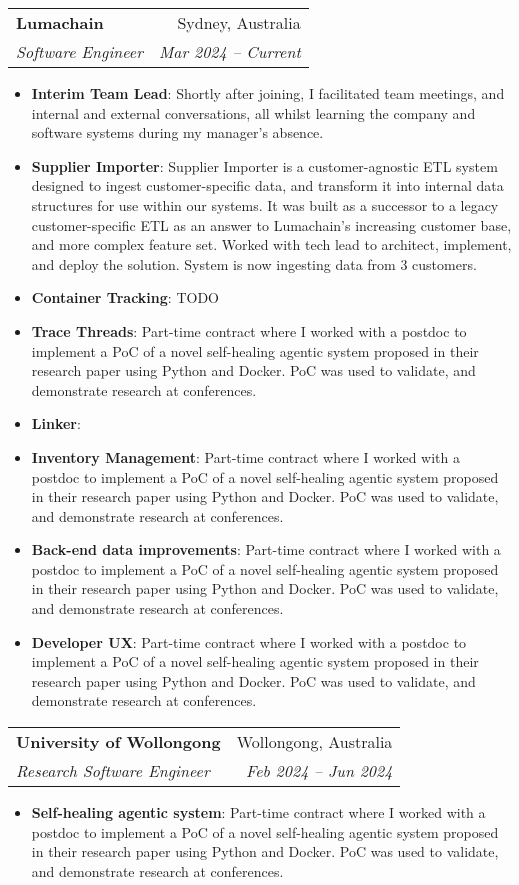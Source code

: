\documentclass[letterpaper,11pt]{article}
\makeatletter
\newcommand{\resumeItem}[2]{
  \item\small{
    \textbf{#1}{: #2 \vspace{-2pt}}
  }
}
\newcommand{\resumeSubheading}[4]{
  \vspace{-1pt}\item
    \begin{tabular*}{0.97\textwidth}[t]{l@{\extracolsep{\fill}}r}
      \textbf{#1} & #2 \\
      \textit{\small#3} & \textit{\small #4} \\
    \end{tabular*}\vspace{-5pt}
}
\newcommand{\resumeItemListStart}{\begin{itemize}}
\newcommand{\resumeItemListEnd}{\end{itemize}\vspace{-5pt}}
\makeatother
\begin{document}
    \resumeSubheading
      {Lumachain}{Sydney, Australia}
      {Software Engineer}{Mar 2024 -- Current}
      \resumeItemListStart
        \resumeItem{Interim Team Lead}
          {Shortly after joining, I facilitated team meetings, and internal and external conversations, all whilst learning the company and software systems during my manager's absence.}
        \resumeItem{Supplier Importer}
          {Supplier Importer is a customer-agnostic ETL system designed to ingest customer-specific data, and transform it into internal data structures for use within our systems. It was built as a successor to a legacy customer-specific ETL as an answer to Lumachain's increasing customer base, and more complex feature set. Worked with tech lead to architect, implement, and deploy the solution. System is now ingesting data from 3 customers. }
        \resumeItem{Container Tracking}
          {TODO}
        \resumeItem{Trace Threads}
          {Part-time contract where I worked with a postdoc to implement a PoC of a novel self-healing agentic system proposed in their research paper using Python and Docker. PoC was used to validate, and demonstrate research at conferences.}
        \resumeItem{Linker}
          {}
        \resumeItem{Inventory Management}
          {Part-time contract where I worked with a postdoc to implement a PoC of a novel self-healing agentic system proposed in their research paper using Python and Docker. PoC was used to validate, and demonstrate research at conferences.}
        \resumeItem{Back-end data improvements}
          {Part-time contract where I worked with a postdoc to implement a PoC of a novel self-healing agentic system proposed in their research paper using Python and Docker. PoC was used to validate, and demonstrate research at conferences.}
        \resumeItem{Developer UX}
          {Part-time contract where I worked with a postdoc to implement a PoC of a novel self-healing agentic system proposed in their research paper using Python and Docker. PoC was used to validate, and demonstrate research at conferences.}
      \resumeItemListEnd

    \resumeSubheading
      {University of Wollongong}{Wollongong, Australia}
      {Research Software Engineer}{Feb 2024 -- Jun 2024}
      \resumeItemListStart
        \resumeItem{Self-healing agentic system}
          {Part-time contract where I worked with a postdoc to implement a PoC of a novel self-healing agentic system proposed in their research paper using Python and Docker. PoC was used to validate, and demonstrate research at conferences.}
      \resumeItemListEnd
\end{document}

